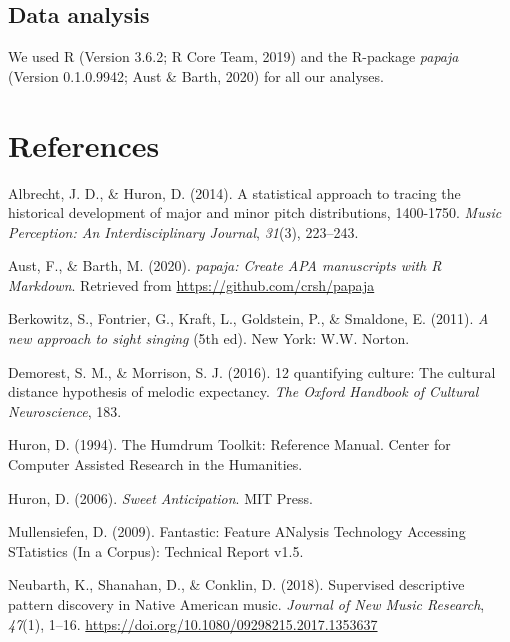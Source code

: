 \documentclass[english,man]{apa6}
\begin{document}
\hypertarget{data-analysis}{%
\subsection{Data analysis}\label{data-analysis}}

We used R (Version 3.6.2; R Core Team, 2019) and the R-package \emph{papaja} (Version 0.1.0.9942; Aust \& Barth, 2020) for all our analyses.

\newpage

\hypertarget{references}{%
\section{References}\label{references}}

\begingroup
\setlength{\parindent}{-0.5in}
\setlength{\leftskip}{0.5in}

\hypertarget{refs}{}
\leavevmode\hypertarget{ref-albrecht2014statistical}{}%
Albrecht, J. D., \& Huron, D. (2014). A statistical approach to tracing the historical development of major and minor pitch distributions, 1400-1750. \emph{Music Perception: An Interdisciplinary Journal}, \emph{31}(3), 223--243.

\leavevmode\hypertarget{ref-R-papaja}{}%
Aust, F., \& Barth, M. (2020). \emph{papaja: Create APA manuscripts with R Markdown}. Retrieved from \url{https://github.com/crsh/papaja}

\leavevmode\hypertarget{ref-berkowitzNewApproachSight2011}{}%
Berkowitz, S., Fontrier, G., Kraft, L., Goldstein, P., \& Smaldone, E. (2011). \emph{A new approach to sight singing} (5th ed). New York: W.W. Norton.

\leavevmode\hypertarget{ref-demorest201612}{}%
Demorest, S. M., \& Morrison, S. J. (2016). 12 quantifying culture: The cultural distance hypothesis of melodic expectancy. \emph{The Oxford Handbook of Cultural Neuroscience}, 183.

\leavevmode\hypertarget{ref-huronHumdrumToolkitReference1994}{}%
Huron, D. (1994). The Humdrum Toolkit: Reference Manual. Center for Computer Assisted Research in the Humanities.

\leavevmode\hypertarget{ref-huronSweetAnticipation2006}{}%
Huron, D. (2006). \emph{Sweet Anticipation}. MIT Press.

\leavevmode\hypertarget{ref-mullensiefenFantasticFeatureANalysis2009}{}%
Mullensiefen, D. (2009). Fantastic: Feature ANalysis Technology Accessing STatistics (In a Corpus): Technical Report v1.5.

\leavevmode\hypertarget{ref-neubarthSupervisedDescriptivePattern2018}{}%
Neubarth, K., Shanahan, D., \& Conklin, D. (2018). Supervised descriptive pattern discovery in Native American music. \emph{Journal of New Music Research}, \emph{47}(1), 1--16. \url{https://doi.org/10.1080/09298215.2017.1353637}
\end{document}
